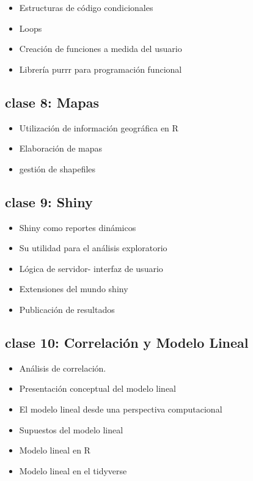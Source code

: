 \documentclass[]{book}
\providecommand{\tightlist}{%
  \setlength{\itemsep}{0pt}\setlength{\parskip}{0pt}}
\begin{document}
\begin{itemize}
\tightlist
\item
  Estructuras de código condicionales
\item
  Loops
\item
  Creación de funciones a medida del usuario
\item
  Librería purrr para programación funcional
\end{itemize}

\hypertarget{clase-8-mapas}{%
\subsection{\texorpdfstring{\textbf{clase 8}: Mapas}{clase 8: Mapas}}\label{clase-8-mapas}}

\begin{itemize}
\tightlist
\item
  Utilización de información geográfica en R
\item
  Elaboración de mapas
\item
  gestión de shapefiles
\end{itemize}

\hypertarget{clase-9-shiny}{%
\subsection{\texorpdfstring{\textbf{clase 9}: Shiny}{clase 9: Shiny}}\label{clase-9-shiny}}

\begin{itemize}
\tightlist
\item
  Shiny como reportes dinámicos
\item
  Su utilidad para el análisis exploratorio
\item
  Lógica de servidor- interfaz de usuario
\item
  Extensiones del mundo shiny
\item
  Publicación de resultados
\end{itemize}

\hypertarget{clase-10-correlacion-y-modelo-lineal}{%
\subsection{\texorpdfstring{\textbf{clase 10}: Correlación y Modelo Lineal}{clase 10: Correlación y Modelo Lineal}}\label{clase-10-correlacion-y-modelo-lineal}}

\begin{itemize}
\tightlist
\item
  Análisis de correlación.
\item
  Presentación conceptual del modelo lineal
\item
  El modelo lineal desde una perspectiva computacional
\item
  Supuestos del modelo lineal
\item
  Modelo lineal en R
\item
  Modelo lineal en el tidyverse
\end{itemize}
\end{document}
